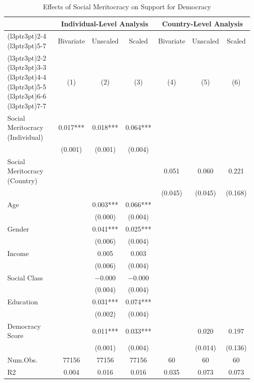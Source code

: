\begin{table}[!h]
\centering\centering
\caption{Effects of Social Meritocracy on Support for Democracy}
\centering
\begin{threeparttable}
\fontsize{7}{9}\selectfont
\begin{tabular}[t]{lcccccc}
\toprule
\multicolumn{1}{c}{ } & \multicolumn{3}{c}{Individual-Level Analysis} & \multicolumn{3}{c}{Country-Level Analysis} \\
\cmidrule(l{3pt}r{3pt}){2-4} \cmidrule(l{3pt}r{3pt}){5-7}
\multicolumn{1}{c}{ } & \multicolumn{1}{c}{Bivariate} & \multicolumn{1}{c}{Unscaled} & \multicolumn{1}{c}{Scaled} & \multicolumn{1}{c}{Bivariate } & \multicolumn{1}{c}{Unscaled } & \multicolumn{1}{c}{Scaled } \\
\cmidrule(l{3pt}r{3pt}){2-2} \cmidrule(l{3pt}r{3pt}){3-3} \cmidrule(l{3pt}r{3pt}){4-4} \cmidrule(l{3pt}r{3pt}){5-5} \cmidrule(l{3pt}r{3pt}){6-6} \cmidrule(l{3pt}r{3pt}){7-7}
  &  (1) &   (2) &   (3) &   (4) &   (5) &   (6)\\
\midrule
Social Meritocracy (Individual) & 0.017*** & 0.018*** & 0.064*** &  &  & \\
 & (0.001) & (0.001) & (0.004) &  &  & \\
Social Meritocracy (Country) &  &  &  & 0.051 & 0.060 & 0.221\\
 &  &  &  & (0.045) & (0.045) & (0.168)\\
Age &  & 0.003*** & 0.066*** &  &  & \\
 &  & (0.000) & (0.004) &  &  & \\
Gender &  & 0.041*** & 0.025*** &  &  & \\
 &  & (0.006) & (0.004) &  &  \vphantom{1} & \\
Income &  & 0.005 & 0.003 &  &  & \\
 &  & (0.006) & (0.004) &  &  & \\
Social Class &  & −0.000 & −0.000 &  &  & \\
 &  & (0.004) & (0.004) &  &  & \\
Education &  & 0.031*** & 0.074*** &  &  & \\
 &  & (0.002) & (0.004) &  &  & \\
Democracy Score &  & 0.011*** & 0.033*** &  & 0.020 & 0.197\\
 &  & (0.001) & (0.004) &  & (0.014) & (0.136)\\
Num.Obs. & 77156 & 77156 & 77156 & 60 & 60 & 60\\
R2 & 0.004 & 0.016 & 0.016 & 0.035 & 0.073 & 0.073\\

\end{tabular}
\end{threeparttable}
\end{table}
